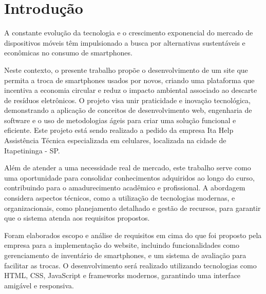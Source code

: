 \chapter{Introdução}
    A constante evolução da tecnologia e o crescimento exponencial do mercado
de dispositivos móveis têm impulsionado a busca por alternativas sustentáveis e
econômicas no consumo de smartphones. 

Neste contexto, o presente trabalho propõe
o desenvolvimento de um site que permita a troca de smartphones usados por novos,
criando uma plataforma que incentiva a economia circular e reduz o impacto ambiental
associado ao descarte de resíduos eletrônicos.
O projeto visa unir praticidade e inovação tecnológica, demonstrando a
aplicação de conceitos de desenvolvimento web, engenharia de software e
o uso de metodologias ágeis para criar uma solução funcional e eficiente.
Este projeto está sendo realizado a pedido da empresa Ita Help Assistência Técnica
especializada em celulares, localizada na cidade de Itapetininga - SP. 

Além de atender a uma necessidade real de mercado, este trabalho serve como uma
oportunidade para consolidar conhecimentos adquiridos ao longo do curso,
contribuindo para o amadurecimento acadêmico e profissional.
A abordagem considera aspectos técnicos, como a utilização de tecnologias
modernas, e organizacionais, como planejamento detalhado e gestão de recursos,
para garantir que o sistema atenda aos requisitos propostos.

Foram elaborados escopo e análise de requisitos em cima do que foi proposto pela empresa
para a implementação do website, incluindo funcionalidades como gerenciamento de inventário de smartphones,
e um sistema de avaliação para facilitar as trocas. O desenvolvimento será realizado 
utilizando tecnologias como HTML, CSS, JavaScript e frameworks modernos, garantindo uma 
interface amigável e responsiva.
\label{chap:intro}